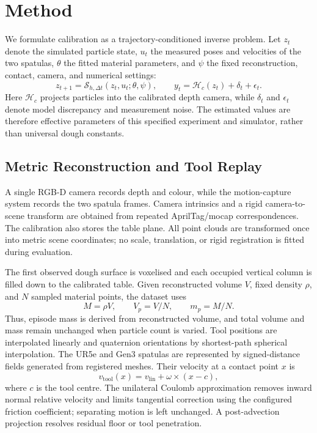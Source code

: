 \section{Method}
\label{sec:method}

We formulate calibration as a trajectory-conditioned inverse problem.  Let
$z_t$ denote the simulated particle state, $u_t$ the measured poses and
velocities of the two spatulas, $\theta$ the fitted material parameters, and
$\psi$ the fixed reconstruction, contact, camera, and numerical settings:
\begin{equation}
 z_{t+1}=\mathcal{S}_{h,\Delta t}(z_t,u_t;\theta,\psi),\qquad
 y_t=\mathcal{H}_{c}(z_t)+\delta_t+\epsilon_t .
 \label{eq:inverse_problem}
\end{equation}
Here $\mathcal{H}_{c}$ projects particles into the calibrated depth camera,
while $\delta_t$ and $\epsilon_t$ denote model discrepancy and measurement
noise.  The estimated values are therefore effective parameters of this
specified experiment and simulator, rather than universal dough constants.

\subsection{Metric Reconstruction and Tool Replay}

A single RGB-D camera records depth and colour, while the motion-capture
system records the two spatula frames.  Camera intrinsics and a rigid
camera-to-scene transform are obtained from repeated AprilTag/mocap
correspondences.  The calibration also stores the table plane.  All point
clouds are transformed once into metric scene coordinates; no scale,
translation, or rigid registration is fitted during evaluation.

The first observed dough surface is voxelised and each occupied vertical
column is filled down to the calibrated table.  Given reconstructed volume
$V$, fixed density $\rho$, and $N$ sampled material points, the dataset uses
\begin{equation}
 M=\rho V,\qquad V_p=V/N,\qquad m_p=M/N .
 \label{eq:mass_initialization}
\end{equation}
Thus, episode mass is derived from reconstructed volume, and total volume and
mass remain unchanged when particle count is varied.  Tool positions are interpolated linearly and quaternion
orientations by shortest-path spherical interpolation.  The UR5e and Gen3
spatulas are represented by signed-distance fields generated from registered
meshes.  Their velocity at a contact point $x$ is
\begin{equation}
 v_{\mathrm{tool}}(x)=v_{\mathrm{lin}}+\omega\times(x-c),
 \label{eq:tool_velocity}
\end{equation}
where $c$ is the tool centre.  The unilateral Coulomb approximation removes
inward normal relative velocity and limits tangential correction using the
configured friction coefficient; separating motion is left unchanged.  A
post-advection projection resolves residual floor or tool penetration.

